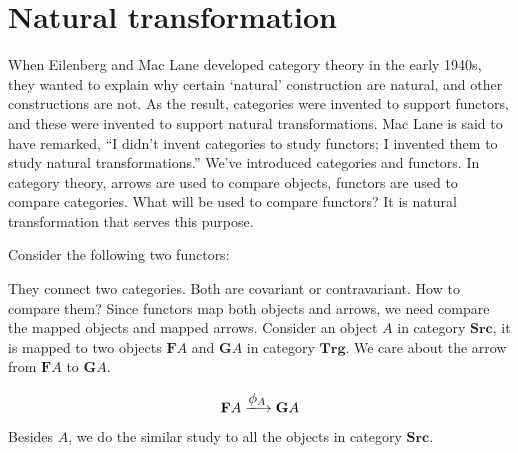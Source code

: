 \documentclass{article}
\begin{document}
\section{Natural transformation}

When Eilenberg and Mac Lane developed category theory in the early 1940s, they wanted to explain why certain ‘natural’ construction are natural, and other constructions are not. As the result, categories were invented to support functors, and these were invented to support natural transformations. Mac Lane is said to have remarked, ``I didn't invent categories to study functors; I invented them to study natural transformations.'' We've introduced categories and functors. In category theory, arrows are used to compare objects, functors are used to compare categories. What will be used to compare functors? It is natural transformation that serves this purpose.

Consider the following two functors:

\begin{center}
\end{center}

They connect two categories. Both are covariant or contravariant. How to compare them? Since functors map both objects and arrows, we need compare the mapped objects and mapped arrows. Consider an object $A$ in category $\pmb{Src}$, it is mapped to two objects $\mathbf{F}A$ and $\mathbf{G}A$ in category $\pmb{Trg}$. We care about the arrow from $\mathbf{F}A$ to $\mathbf{G}A$.

\[
\mathbf{F}A \arrowto{\phi_A} \mathbf{G}A
\]

Besides $A$, we do the similar study to all the objects in category $\pmb{Src}$.
\end{document}
